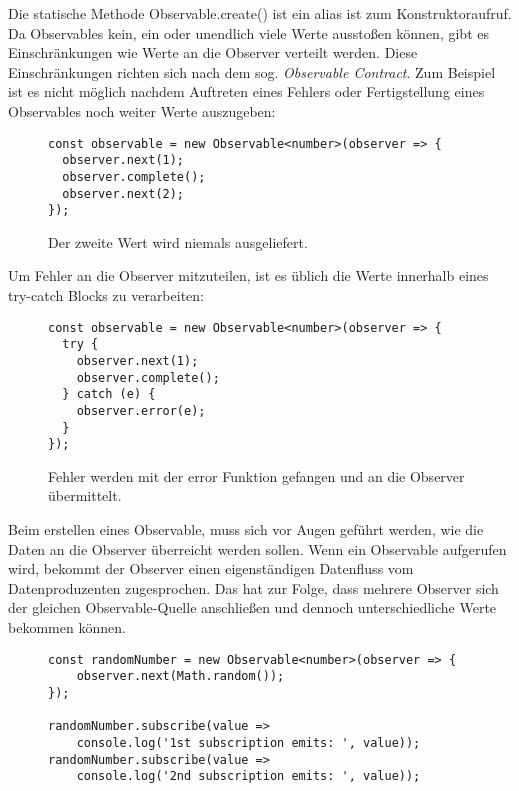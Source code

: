 \noindent
Die statische Methode Observable.create() ist ein alias ist zum Konstruktoraufruf. Da Observables kein, ein oder unendlich viele Werte ausstoßen können, gibt es Einschränkungen wie Werte an die Observer verteilt werden. Diese Einschränkungen richten sich nach dem sog. \textit{Observable Contract}. Zum Beispiel ist es nicht möglich nachdem Auftreten eines Fehlers oder Fertigstellung eines Observables noch weiter Werte auszugeben:

\begin{figure}[H]
\begin{lstlisting}[basicstyle=\small]
const observable = new Observable<number>(observer => {
  observer.next(1);
  observer.complete();
  observer.next(2);
});
\end{lstlisting}
\caption{Der zweite Wert wird niemals ausgeliefert.}
\end{figure}

\noindent
Um Fehler an die Observer mitzuteilen, ist es üblich die Werte innerhalb eines try-catch Blocks zu verarbeiten:

\begin{figure}[H]
\begin{lstlisting}[basicstyle=\small]
const observable = new Observable<number>(observer => {
  try {
    observer.next(1);
    observer.complete();
  } catch (e) {
    observer.error(e);
  }
});
\end{lstlisting}
\caption{Fehler werden mit der error Funktion gefangen und an die Observer übermittelt.}
\end{figure}

\noindent
Beim erstellen eines Observable, muss sich vor Augen geführt werden, wie die Daten an die Observer überreicht werden sollen. Wenn ein Observable aufgerufen wird, bekommt der Observer einen eigenständigen Datenfluss vom Datenproduzenten zugesprochen. Das hat zur Folge, dass mehrere Observer sich der gleichen Observable-Quelle anschließen und dennoch unterschiedliche Werte bekommen können.

\begin{figure}[H]
\begin{lstlisting}[basicstyle=\small]
const randomNumber = new Observable<number>(observer => {
    observer.next(Math.random());
});

randomNumber.subscribe(value =>
    console.log('1st subscription emits: ', value));
randomNumber.subscribe(value =>
    console.log('2nd subscription emits: ', value));
\end{lstlisting}
\end{figure}

